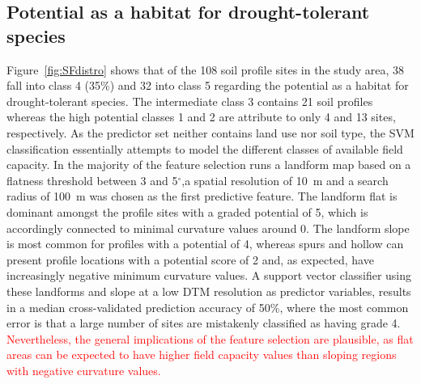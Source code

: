 \documentclass[soilsystems,article,submit,moreauthors,pdftex,10pt,a4paper]{Definitions/mdpi}
\begin{document}
\begin{table}[!htbp]
{\begin{tabular}{l|ccccc|cc}
\end{tabular}}
\label{table:cvacc}
\end{table}
\subsection{Potential as a habitat for drought-tolerant species}
Figure~\ref{fig:SFdistro} shows that of the 108 soil profile sites in the study area, 38 fall into class 4 (35\%) and 32 into class 5 regarding the potential as a habitat for drought-tolerant species. The intermediate class 3 contains 21 soil profiles whereas the high potential classes 1 and 2 are attribute to only 4 and 13 sites, respectively. 
As the predictor set neither contains land use nor soil type, the SVM classification essentially attempts to model the different classes of available field capacity. In the majority of the feature selection runs a landform map based on a flatness threshold between 3 and 5$^{\circ}$,a spatial resolution of 10~m and a search radius of 100~m was chosen as the first predictive feature. The landform flat is dominant amongst the profile sites with a graded potential of 5, which is accordingly connected to minimal curvature values around 0. The landform slope is  most common for profiles with a potential  of 4, whereas spurs and hollow can present profile locations with a  potential score of 2 and, as expected, have increasingly negative minimum curvature values. A support vector classifier using these landforms and slope at a low DTM resolution as predictor variables, results in a median cross-validated prediction accuracy of 50\%, where the most common error is that  a large number of sites are mistakenly classified as having grade 4. \textcolor{red}{Nevertheless, the general implications of the feature selection are plausible, as flat areas  can  be expected to have higher field capacity values than sloping regions with negative curvature values.}
\end{document}
